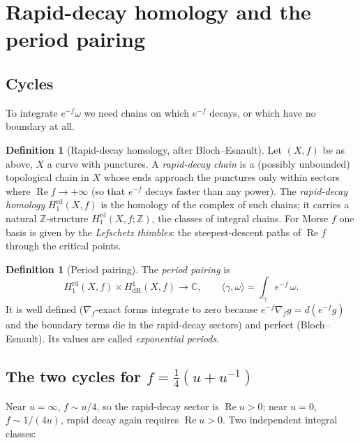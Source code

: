 \documentclass[11pt]{article}
\theoremstyle{definition}
\newtheorem{definition}[proposition]{Definition}
\theoremstyle{remark}
\newcommand{\C}{\mathbb{C}}
\newcommand{\Z}{\mathbb{Z}}
\newcommand{\dR}{\mathrm{dR}}
\newcommand{\rd}{\mathrm{rd}}
\begin{document}
\section{Rapid-decay homology and the period pairing}

\subsection{Cycles}

To integrate $e^{-f}\omega$ we need chains on which $e^{-f}$
decays, or which have no boundary at all.

\begin{definition}[Rapid-decay homology, after Bloch--Esnault]
Let $(X, f)$ be as above, $X$ a curve with punctures. A
\emph{rapid-decay chain} is a (possibly unbounded) topological
chain in $X$ whose ends approach the punctures only within sectors
where $\operatorname{Re} f \to +\infty$ (so that $e^{-f}$ decays
faster than any power). The \emph{rapid-decay homology}
$H_1^{\rd}(X, f)$ is the homology of the complex of such chains; it
carries a natural $\Z$-structure $H_1^{\rd}(X, f; \Z)$, the classes
of integral chains. For Morse $f$ one basis is given by the
\emph{Lefschetz thimbles}: the steepest-descent paths of
$\operatorname{Re} f$ through the critical points.
\end{definition}

\begin{definition}[Period pairing]
The \emph{period pairing} is
\[
  H_1^{\rd}(X, f) \times H^1_{\dR}(X, f) \longrightarrow \C,
  \qquad
  \langle \gamma, \omega \rangle
  = \int_\gamma e^{-f}\,\omega.
\]
It is well defined ($\nabla_f$-exact forms integrate to zero
because $e^{-f}\nabla_f g = d(e^{-f}g)$ and the boundary terms die
in the rapid-decay sectors) and perfect (Bloch--Esnault). Its
values are called \emph{exponential periods}.
\end{definition}

\subsection{The two cycles for $f = \tfrac14(u+u^{-1})$}

Near $u = \infty$, $f \sim u/4$, so the rapid-decay sector is
$\operatorname{Re} u > 0$; near $u = 0$, $f \sim 1/(4u)$, rapid
decay again requires $\operatorname{Re} u > 0$. Two independent
integral classes:
\end{document}
